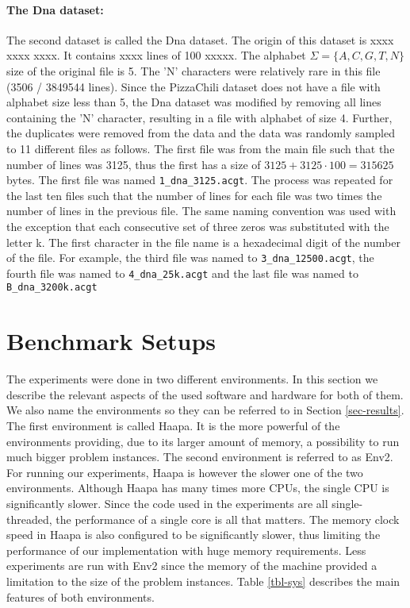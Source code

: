 \documentclass[english,twoside,censored,csm,algorithms-track-2020]{HYthesisML}
\theoremstyle{plain}
\theoremstyle{definition}
\begin{document}
\paragraph{The Dna dataset:}
The second dataset is called the Dna dataset. The origin of this dataset is xxxx xxxx xxxx.
It contains xxxx lines of 100 xxxxx. The alphabet $\Sigma=\{A,C,G,T,N\}$ size of the original file is 5.
The 'N' characters were relatively rare in this file (3506 / 3849544 lines).
Since the PizzaChili dataset does not have a
file with alphabet size less than 5, the Dna dataset was modified by removing all lines containing
the 'N' character, resulting in a file with alphabet of size 4.
Further, the duplicates were removed from the data and the data was randomly sampled to 11 different
files as follows. The first file was from the main file such that the number of lines was 3125, thus
the first has a size of $3125+3125\cdot 100 = 315625$ bytes. The first file was named
\texttt{1\_dna\_3125.acgt}. The process was repeated for the last ten files such that the number
of lines for each file was two times the number of lines in the previous file.
The same naming convention
was used with the exception that each consecutive set of three zeros was substituted with the letter k.
The first character in the file name is a hexadecimal digit of the number of the file.
For example, the third file was named to \texttt{3\_dna\_12500.acgt}, the fourth file was named
to \texttt{4\_dna\_25k.acgt} and the last file was named to \texttt{B\_dna\_3200k.acgt}

\section{Benchmark Setups}

The experiments were done in two different environments. In this section we describe the relevant
aspects of the used software and hardware for both of them. We also name the environments so they
can be referred to in Section \ref{sec-results}. The first environment is called Haapa. It is the more
powerful of the environments providing, due to its larger amount of memory, a possibility to run
much bigger problem instances. The second
environment is referred to as Env2. For running
our experiments, Haapa is however the slower one of the two environments. Although Haapa has many times
more CPUs, the single CPU is significantly slower. Since the code used in the experiments
are all single-threaded, the performance of a single core is all that matters. The memory
clock speed in Haapa is also configured to be significantly slower, thus limiting the performance
of our implementation with huge memory requirements. Less experiments are run with Env2 since the
memory of the machine provided a limitation to the size of the problem instances.
Table \ref{tbl-sys} describes the main features of both environments.
\end{document}
